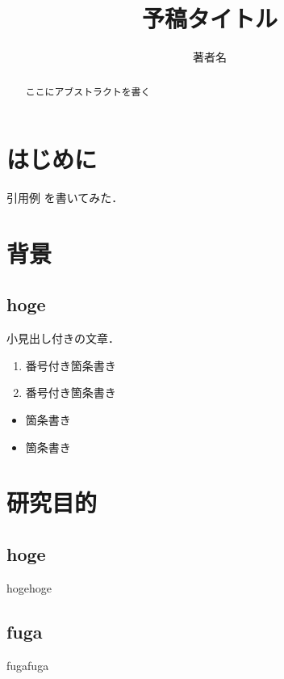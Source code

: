 \documentclass[a4paper,10pt]{article}
\begin{document}
\title{予稿タイトル}

\author{著者名}

\begin{abstract}
ここにアブストラクトを書く
\end{abstract}

\maketitle
\thispagestyle{empty}

\section{はじめに}

引用例 \cite{test} を書いてみた．

\section{背景}

\subsection{hoge}
小見出し付きの文章．

\begin{enumerate}
\item 番号付き箇条書き 
\item 番号付き箇条書き
\end{enumerate}

\begin{itemize}
\item 箇条書き
\item 箇条書き
\end{itemize}


\section{研究目的}

\subsection{hoge}
hogehoge
 
\subsection{fuga}
fugafuga
\end{document}
